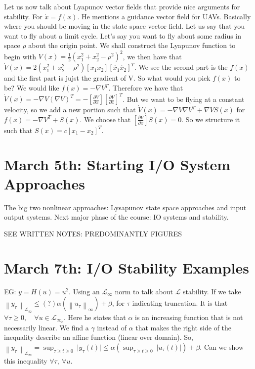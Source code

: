 \documentclass[11pt]{article}
\newcommand{\norm}[1]{\left\lVert#1\right\rVert}
\begin{document}
Let us now talk about Lyapunov vector fields that provide nice arguments for stability. For $\dot{x} = f(x)$. He mentions a guidance vector field for UAVs. Basically where you should be moving in the state space vector field. Let us say that you want to fly about a limit cycle. Let's say you want to fly about some radius in space $\rho$ about the origin point. We shall construct the Lyapunov function to begin with $V(x) = \frac{1}{2} (x_1^2 +x_2^2 - \rho^2)^2$, we then have that $\dot{V}(x) = 2(x_1^2 + x_2^2 - \rho^2) [x_1 x_2] [\dot{x_1} \dot{x_2}]^T$. We see the second part is the $f(x)$ and the first part is jujst the gradient of V. So what would you pick $f(x)$ to be? We would like $f(x) = -\nabla V ^T$. Therefore we have that $\dot{V}(x) = - \nabla V (\nabla V)^T = -[\frac{\partial V}{\partial x}][\frac{\partial V}{\partial x}]^T$. But we want to be flying at a constant velocity, so we add a new portion such that $\dot{V}(x) = - \nabla V \nabla V^T + \nabla V S(x)$ for $f(x) = -\nabla V ^T + S(x)$. We choose that $[\frac{\partial V}{\partial x}]S(x) = 0$. So we structure it such that $S(x) = c [x_1 -x_2]^T$.
 


\section{March 5th: Starting I/O System Approaches}
The big two nonlinear approaches: Lysapunov state space approaches and input output systems. Next major phase of the course: IO systems and stability.

SEE WRITTEN NOTES: PREDOMINANTLY FIGURES


\section{March 7th: I/O Stability Examples}
EG: $y = H(u) = u^2$. Using an $\mathcal{L}_\infty$ norm to talk about $\mathcal{L}$ stability.
If we take $\norm{y_\tau}_{\mathcal{L}_\infty} \leq (?) \alpha(\norm{u_\tau}_\infty) + \beta$, for $\tau$ indicating truncation. It is that $\forall \tau \geq 0, \quad \forall u \in \mathcal{L}_{\infty_e}$. Here he states that $\alpha$ is an increasing function that is not necessarily linear. We find a $\gamma$ instead of $\alpha$ that makes the right side of the inequality describe an affine function (linear over domain). So, $\norm{y_\tau}_{\mathcal{L}_\infty} = \sup_{\tau \geq t \geq 0} \ \rvert y_\tau(t) \rvert \leq \alpha (\sup_{\tau \geq t \geq 0} \ \rvert u_\tau (t)\rvert) + \beta$. Can we show this inequality $\forall \tau, \ \forall u$.
\end{document}
